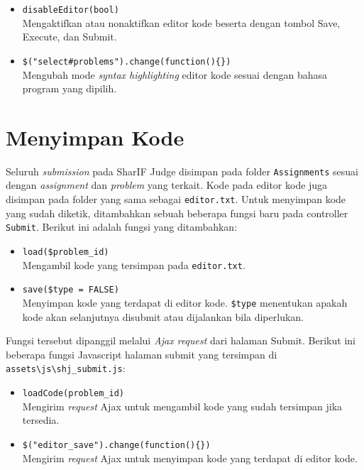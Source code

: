 \begin{itemize}
    \item \verb|disableEditor(bool)| \\ Mengaktifkan atau nonaktifkan editor kode beserta dengan tombol Save, Execute, dan Submit.
    \item \verb|$("select#problems").change(function(){})| \\ Mengubah mode \textit{syntax highlighting} editor kode sesuai dengan bahasa program yang dipilih.
\end{itemize}

\section{Menyimpan Kode}

Seluruh \textit{submission} pada SharIF Judge disimpan pada folder \verb|Assignments| sesuai dengan \textit{assignment} dan \textit{problem} yang terkait. Kode pada editor kode juga disimpan pada folder yang sama sebagai \verb|editor.txt|. Untuk menyimpan kode yang sudah diketik, ditambahkan sebuah beberapa fungsi baru pada controller \verb|Submit|. Berikut ini adalah fungsi yang ditambahkan:

\begin{itemize}
    \item \verb|load($problem_id)| \\ Mengambil kode yang tersimpan pada \verb|editor.txt|.
    \item \verb|save($type = FALSE)| \\ Menyimpan kode yang terdapat di editor kode. \verb|$type| menentukan apakah kode akan selanjutnya disubmit atau dijalankan bila diperlukan.
\end{itemize}

Fungsi tersebut dipanggil melalui \textit{Ajax request} dari halaman Submit. Berikut ini beberapa fungsi Javascript halaman submit yang tersimpan di \verb|assets\js\shj_submit.js|:

\begin{itemize}
    \item \verb|loadCode(problem_id)| \\ Mengirim \textit{request} Ajax untuk mengambil kode yang sudah tersimpan jika tersedia.
    \item \verb|$("editor_save").change(function(){})| \\ Mengirim \textit{request} Ajax untuk menyimpan kode yang terdapat di editor kode.
\end{itemize}


